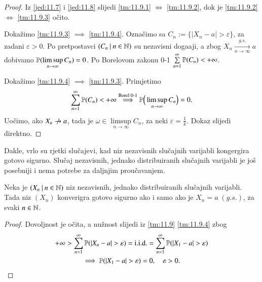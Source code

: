 \begin{proof}
    Iz \eqref{jed:11.7} i \eqref{jed:11.8} slijedi \ref{tm:11.9.1} $\iff$ \ref{tm:11.9.2}, dok je \ref{tm:11.9.2} $\iff$ \ref{tm:11.9.3} o\v cito.

    Doka\v zimo \ref{tm:11.9.3} $\implies$ \ref{tm:11.9.4}.
    Ozna\v cimo sa $C_n := \{ |X_n - a| > \varepsilon\}$, za zadani $\varepsilon > 0$.
    Po pretpostavci $({C_n} \: | \: {n \in \mathbb{N}})$ su nezavisni doga\dj aji, a zbog $X_n \xrightarrow[n \to \infty]{g.s.} a$ dobivamo $\mathbb{P}({\limsup\limits_{n \to \infty} C_n}) = 0$.
    Po Borelovom zakonu 0-1 $\sum\limits_{n = 1}^{\infty} \mathbb{P}({C_n}) < +\infty$.

    Doka\v zimo \ref{tm:11.9.4} $\implies$ \ref{tm:11.9.3}.
    Primjetimo
    \begin{equation*}
        \sum\limits_{n = 1}^{\infty} \mathbb{P}({C_n}) < +\infty \overset{\textnormal{Borel 0-1}}{\implies} \mathbb{P} \Big( \limsup\limits_{n \to \infty} C_n \Big) = 0.
    \end{equation*}
    Uo\v cimo, ako $X_n \centernot{\to} a$, tada je $\omega \in \limsup\limits_{n \to \infty} C_n$, za neki $\varepsilon = \frac{1}{k}$.
    Dokaz slijedi direktno.
\end{proof}

Dakle, vrlo su rjetki slu\v cajevi, kad niz nezavisnih slu\v cajnih varijabli kongergira gotovo sigurno.
Slu\v caj nezavisnih, jednako distribuiranih slu\v cajnih varijabli je jo\v s posebniji i nema potrebe za daljnjim prou\v cavanjem.

\begin{kor} \label{kor:11.10}
    Neka je $({X_n} \: | \: {n \in \mathbb{N}})$ niz nezavisnih, jednako distribuiranih slu\v cajnih varijabli.
    Tada niz $(X_n)$ konverigra gotovo sigurno ako i samo ako je $X_n = a \; (g.s.)$, za svaki $n \in \mathbb{N}$.
\end{kor}

\begin{proof}
    Dovoljnost je o\v cita, a nu\v znost slijedi iz \ref{tm:11.9} \ref{tm:11.9.4} zbog
    \begin{equation*}
        \begin{gathered}
            +\infty > \suma{n = 1}{\infty} \vjeroj{|X_n - a|>\varepsilon} = \iid = \suma{n = 1}{\infty} \vjeroj{|X_1 - a|> \varepsilon}\\
            \implies \vjeroj{|X_1 - a| > \varepsilon} = 0, \quad \varepsilon > 0.
        \end{gathered}
    \end{equation*}
\end{proof}

